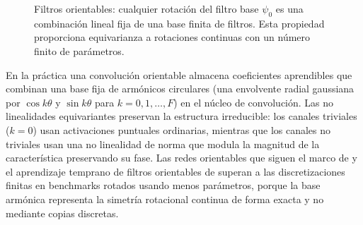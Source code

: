 \begin{figure}[h]
\caption[Filtros orientables]{Filtros orientables: cualquier rotaci\'on del
filtro base $\psi_0$ es una combinaci\'on lineal fija de una base finita de
filtros. Esta propiedad proporciona equivarianza a rotaciones continuas con un
n\'umero finito de par\'ametros.}
\label{fig:groups:steerable}
\end{figure}

En la pr\'actica una convoluci\'on orientable almacena coeficientes aprendibles
que combinan una base fija de arm\'onicos circulares (una envolvente radial
gaussiana por $\cos k\theta$ y $\sin k\theta$ para $k = 0, 1, \dots, F$) en el
n\'ucleo de convoluci\'on. Las no linealidades equivariantes preservan la
estructura irreducible: los canales triviales ($k=0$) usan activaciones puntuales
ordinarias, mientras que los canales no triviales usan una no linealidad de norma
que modula la magnitud de la caracter\'istica preservando su fase. Las redes
orientables que siguen el marco de \citet{weiler2019general} y el aprendizaje
temprano de filtros orientables de \citet{weiler2018learningsteerable} superan a
las discretizaciones finitas en benchmarks rotados usando menos par\'ametros,
porque la base arm\'onica representa la simetr\'ia rotacional continua de forma
exacta y no mediante copias discretas.

